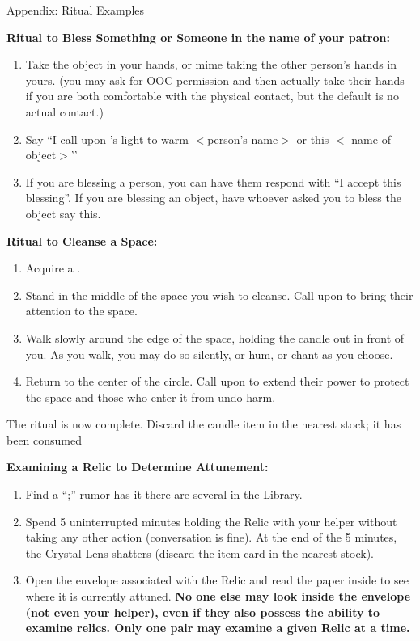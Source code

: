 \documentclass[green]{GL2020}
\begin{document}
{\Large Appendix: Ritual Examples}

\textbf{Ritual to Bless Something or Someone in the name of your patron:}
  \begin{enumerate}
    \item Take the object in your hands, or mime taking the other person’s hands in yours. (you may ask for OOC permission and then actually take their hands if you are both comfortable with the physical contact, but the default is no actual contact.)
    \item Say ``I call upon \cFarmGod{}’s light to warm $<$person’s name$>$ or this $<$ name of object$>$’’
    \item If you are blessing a person, you can have them respond with ``I accept this blessing''. If you are blessing an object, have whoever asked you to bless the object say this.
  \end{enumerate}

\textbf{Ritual to Cleanse a Space:}
  \begin{enumerate}
    \item Acquire a \iRitualCandle{}.
    \item Stand in the middle of the space you wish to cleanse. Call upon \cFarmGod{} to bring their attention to the space.
    \item Walk slowly around the edge of the space, holding the candle out in front of you. As you walk, you may do so silently, or hum, or chant as you choose.
    \item Return to the center of the circle. Call upon \cFarmGod{} to extend their power to protect the space and those who enter it from undo harm.
  \end{enumerate}
The ritual is now complete. Discard the candle item in the nearest stock; it has been consumed
   
\textbf{Examining a Relic to Determine Attunement:}
  \begin{enumerate}
    \item Find a ``\iCrystalLens{};'' rumor has it there are several in the Library. 
    \item Spend 5 uninterrupted minutes holding the Relic with your helper without taking any other action (conversation is fine). At the end of the 5 minutes, the Crystal Lens shatters (discard the item card in the nearest stock). 
    \item Open the envelope associated with the Relic and read the paper inside to see where it is currently attuned. \textbf{No one else may look inside the envelope (not even your helper), even if they also possess the ability to examine relics. Only one pair may examine a given Relic at a time.}
  \end{enumerate}
   
\end{document}
